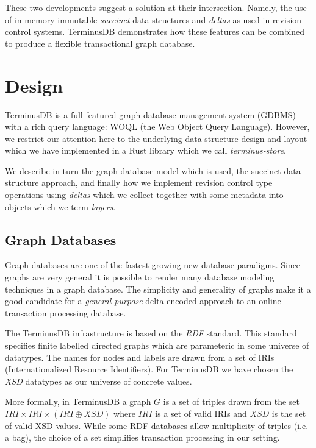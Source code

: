 \documentclass[10pt, a4paper, twocolumn]{article} %
\begin{document}
These two developments suggest a solution at their
intersection. Namely, the use of in-memory immutable {\em succinct}
data structures and {\em deltas} as used in revision control
systems. TerminusDB demonstrates how these features can be combined to
produce a flexible transactional graph database.

\section{Design}

TerminusDB is a full featured graph database management system (GDBMS)
with a rich query language: WOQL (the Web Object Query Language).
However, we restrict our attention here to the underlying data
structure design and layout which we have implemented in a
Rust\autocite{Blandy:2015:RPL:3019371} library which we call
{\em{terminus-store}}.

We describe in turn the graph database model which is used, the
succinct data structure approach, and finally how we implement
revision control type operations using {\em deltas} which we collect
together with some metadata into objects which we term {\em layers}.

\subsection{Graph Databases}

Graph databases are one of the fastest growing new database
paradigms. Since graphs are very general it is possible to render many
database modeling techniques in a graph database. The simplicity and
generality of graphs make it a good candidate for a {\em
  general-purpose} delta encoded approach to an online transaction
processing database.

The TerminusDB infrastructure is based on the {\em RDF} standard. This
standard specifies finite labelled directed graphs which are
parameteric in some universe of datatypes. The names for nodes and
labels are drawn from a set of IRIs (Internationalized Resource
Identifiers). For TerminusDB we have chosen the {\em XSD} datatypes as
our universe of concrete values.

More formally, in TerminusDB a graph \(G\) is a set of triples drawn
from the set \( IRI \times IRI \times (IRI \oplus XSD)\) where \(IRI\)
is a set of valid IRIs and \(XSD\) is the set of valid XSD values.
While some RDF databases allow multiplicity of triples (i.e. a bag),
the choice of a set simplifies transaction processing in our setting.
\end{document}
